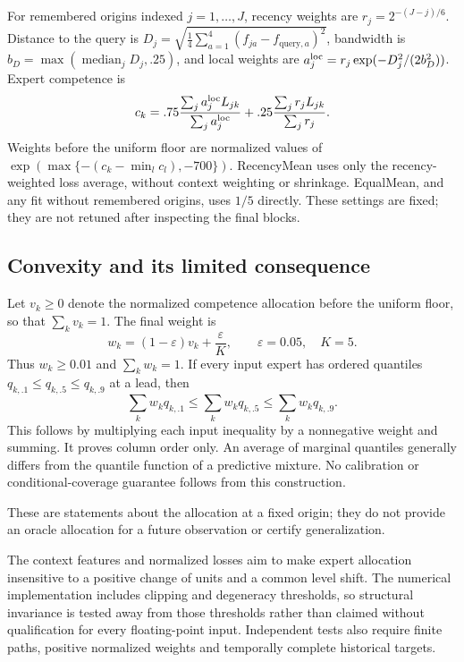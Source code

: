 \documentclass[11pt,a4paper]{article}
\begin{document}
For remembered origins indexed $j=1,\ldots,J$, recency weights are $r_j=2^{-(J-j)/6}$. Distance to the query is $D_j=\sqrt{\frac14\sum_{a=1}^4(f_{ja}-f_{\mathrm{query},a})^2}$, bandwidth is $b_D=\max(\operatorname{median}_jD_j,.25)$, and local weights are $a_j^{\rm loc}=r_j\exp(-D_j^2/(2b_D^2))$. Expert competence is
\begin{equation}
c_k=.75\frac{\sum_j a_j^{\rm loc}L_{jk}}{\sum_j a_j^{\rm loc}}+.25\frac{\sum_j r_jL_{jk}}{\sum_j r_j}.
\end{equation}
Weights before the uniform floor are normalized values of $\exp(\max\{-(c_k-\min_lc_l),-700\})$. RecencyMean uses only the recency-weighted loss average, without context weighting or shrinkage. EqualMean, and any fit without remembered origins, uses $1/5$ directly. These settings are fixed; they are not retuned after inspecting the final blocks.

\subsection{Convexity and its limited consequence}
Let $v_k\geq0$ denote the normalized competence allocation before the uniform floor, so that $\sum_kv_k=1$. The final weight is
\begin{equation}
w_k=(1-\varepsilon)v_k+\frac{\varepsilon}{K},\qquad \varepsilon=0.05,\quad K=5.
\end{equation}
Thus $w_k\geq0.01$ and $\sum_kw_k=1$. If every input expert has ordered quantiles $q_{k,.1}\leq q_{k,.5}\leq q_{k,.9}$ at a lead, then
\begin{equation}
\sum_kw_kq_{k,.1}\leq\sum_kw_kq_{k,.5}\leq\sum_kw_kq_{k,.9}.
\end{equation}
This follows by multiplying each input inequality by a nonnegative weight and summing. It proves column order only. An average of marginal quantiles generally differs from the quantile function of a predictive mixture. No calibration or conditional-coverage guarantee follows from this construction.

These are statements about the allocation at a fixed origin; they do not provide an oracle allocation for a future observation or certify generalization.

The context features and normalized losses aim to make expert allocation insensitive to a positive change of units and a common level shift. The numerical implementation includes clipping and degeneracy thresholds, so structural invariance is tested away from those thresholds rather than claimed without qualification for every floating-point input. Independent tests also require finite paths, positive normalized weights and temporally complete historical targets.
\end{document}
